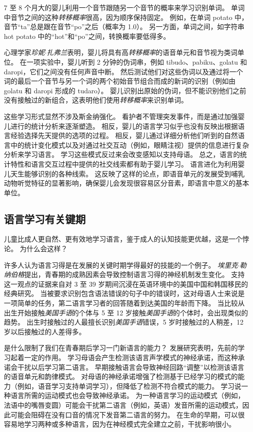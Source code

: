 7 至 8 个月大的婴儿利用一个音节跟随另一个音节的概率来学习识别单词。
单词中音节之间的这种\textit{转移概率}很高，因为顺序保持固定。
例如，在单词 potato 中，音节“ta”总是跟在音节“po”之后（概率为 1.0）。
另一方面，单词之间，如字符串 hot potato 中的“hot”和“po”之间，转换概率要低得多。


心理学家\textit{珍妮$\cdot$扎弗兰}表明，婴儿将具有高\textit{转移概率}的语音单元和音节视为类词单位。
在一项实验中，婴儿听到 2 分钟的伪词串，例如 tibudo、pabiku、golatu 和 daropi，它们之间没有任何声音中断。
然后测试他们对这些伪词以及通过将一个词的最后一个音节与另一个词的两个初始音节组合而成的新词的识别（例如由 golatu 和 daropi 形成的 tudaro）。
婴儿识别出原始的伪词，但不能识别他们之前没有接触过的新组合，这表明他们使用\textit{转移概率}来识别单词。


这些学习形式显然不涉及斯金纳强化。
看护者不管理突发事件，而是通过加强婴儿进行的统计分析来逐渐塑造。
相反，婴儿的语言学习似乎也没有反映出根据语言经验选择先天提供的选项的过程。
相反，婴儿通过详细分析他们听到的自然语言中的统计变化模式以及对通过社交互动（例如，眼睛注视）提供的信息进行复杂分析来学习语言。
学习这些模式反过来会改变感知以支持母语。
总之，语言的统计特性和语言交互过程中提供的社交线索都有助于婴儿学习。
语言进化为利用婴儿天生能够识别的各种线索。
这反映了这样的论点，即语音单元的发展受到哺乳动物听觉特征的显著影响，确保婴儿会发现很容易区分音素，即语言中意义的基本单位。



\subsection{语言学习有关键期}

儿童比成人更自然、更有效地学习语言，鉴于成人的认知技能更优越，这是一个悖论。
为什么会这样？


许多人认为语言习得是在发展的关键时期学得最好的技能的一个例子。
\textit{埃里克$\cdot$勒纳伯格}提出，青春期的成熟因素会导致控制语言习得的神经机制发生变化。
支持这一观点的证据来自对 3 至 39 岁期间沉浸在英语环境中的美国中国和韩国移民的经典研究。
当被要求识别包含语法错误的句子中的错误时，这对母语人士来说是一项简单的任务，第二语言学习者的回答随着到达美国的年龄而下降。
当比较从出生开始接触\textit{美国手语}的个体与 5 至 12 岁接触\textit{美国手语}的个体时，会出现类似的趋势。
出生时接触过的人最擅长识别\textit{美国手语}错误，5 岁时接触过的人稍差，12 岁以后接触过的人差得多。


是什么限制了我们在青春期后学习一门新语言的能力？
发展研究表明，先前的学习起着一定的作用。
学习母语会产生检测该语言声学模式的神经承诺，而这种承诺会干扰以后学习第二语言。
早期接触语言会导致神经回路“调整”以检测该语言的语音单元和韵律模式。
对母语的神经承诺增强了检测基于已经学习的模式的能力（例如，语音学习支持单词学习），但降低了检测不符合模式的能力。
学习说一种语言所需的运动模式也会导致神经承诺。
为一种语言学习的运动模式（例如，法语中的嘴唇变圆）可能会干扰第二语言（例如，英语）发音所需的运动模式，因此可能会阻碍在没有口音的情况下发音第二语言的努力。
在生命的早期，可以很容易地学习两种或多种语言，因为在神经模式完全建立之前，干扰影响很小。


